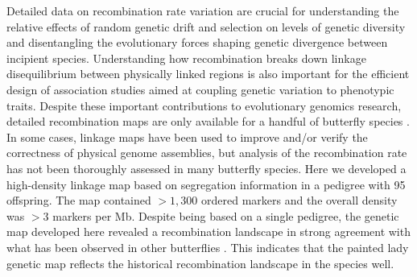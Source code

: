 \documentclass[twocolumn]{bmcart}%
\begin{document}
Detailed data on recombination rate variation are crucial for understanding the relative effects of random genetic drift and selection on levels of genetic diversity and disentangling the evolutionary forces shaping genetic divergence between incipient species. Understanding how recombination breaks down linkage disequilibrium between physically linked regions is also important for the efficient design of association studies aimed at coupling genetic variation to phenotypic traits. Despite these important contributions to evolutionary genomics research, detailed recombination maps are only available for a handful of butterfly species \cite{beldadeGeneBasedLinkageMap2009, celorio-manceraChromosomeLevelAssembly2021, daveyNoEvidenceMaintenance2017, rosserComplexBasisHybrid2022, smolanderImprovedChromosomelevelGenome2022, tunstromComplexInterplayBalancing2021}. In some cases, linkage maps have been used to improve and/or verify the correctness of physical genome assemblies, but analysis of the recombination rate has not been thoroughly assessed in many butterfly species. Here we developed a high-density linkage map based on segregation information in a pedigree with 95 offspring. The map contained $> 1,300$ ordered markers and the overall density was $> 3$ markers per Mb. Despite being based on a single pedigree, the genetic map developed here revealed a recombination landscape in strong agreement with what has been observed in other butterflies \cite{daveyNoEvidenceMaintenance2017, martinRecombinationRateVariation2019}. This indicates that the painted lady genetic map reflects the historical recombination landscape in the species well. 
\end{document}
